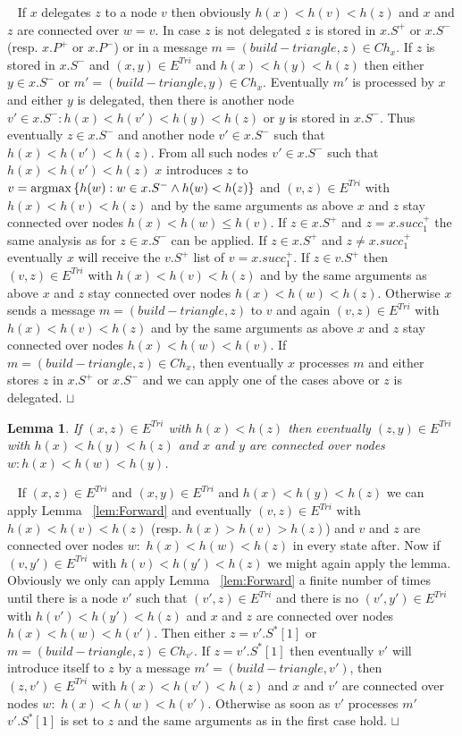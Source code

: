 \documentclass[11pt]{article}
\newtheorem{lemma}[theorem]{Lemma}
\newcommand{\sq}{\hbox{\rlap{$\sqcap$}$\sqcup$}}
\newcommand{\qed}{\hspace*{\fill}\sq}
\newenvironment{proof}{\noindent {\bf Proof.}\ }{\qed\par\vskip 4mm\par}
\def\argmax{{\rm argmax}}
\begin{document}
\begin{proof}
If $x$ delegates $z$ to a node $v$ then obviously $h(x)<h(v)<h(z)$ and $x$ and $z$ are connected over $w=v$.
In case $z$ is not delegated $z$ is stored in $x.S^+$ or $x.S^-$ (resp. $x.P^+$ or $x.P^-$) or in a message $m=(build-triangle,z) \in Ch_x$. If $z$ is stored in $x.S^-$ and  $(x,y) \in E^{Tri}$ and $h(x)<h(y)<h(z)$ then either $y \in x.S^-$ or $m'=(build-triangle,y) \in Ch_x$. Eventually $m'$ is processed by $x$ and either $y$ is delegated, then there is another node $v'\in x.S^- : h(x)<h(v')<h(y)<h(z)$ or $y$ is stored in $x.S^-$. Thus eventually $z \in x.S^-$ and another node $v'\in x.S^-$ such that $h(x)<h(v')<h(z)$. From all such nodes $v'\in x.S^-$ such that $h(x)<h(v')<h(z)$ $x$ introduces $z$ to $v=\argmax \left\{h(w): w \in x.S^- \wedge h(w)<h(z) \right\}$ and $(v,z)\in E^{Tri}$ with $h(x)<h(v)<h(z)$ and by the same arguments as above $x$ and $z$ stay connected over nodes $h(x)<h(w)\leq h(v)$.
If $z \in x.S^+$ and $z= x.succ^+_1$ the same analysis as for $z\in x.S^-$ can be applied. If $z \in x.S^+$ and $z\neq x.succ^+_1$ eventually $x$ will receive the $v.S^+$ list of $v=x.succ^+_1$. If $z \in v.S^+$ then $(v,z)\in E^{Tri}$ with $h(x)<h(v)<h(z)$ and by the same arguments as above $x$ and $z$ stay connected over nodes $h(x)<h(w)<h(z)$. Otherwise $x$ sends a message $m=(build-triangle,z)$ to $v$ and again $(v,z)\in E^{Tri}$ with $h(x)<h(v)<h(z)$ and by the same arguments as above $x$ and $z$ stay connected over nodes $h(x)<h(w)<h(v)$.
If $m=(build-triangle,z) \in Ch_x$, then eventually $x$ processes $m$ and either stores $z$ in $x.S^+$ or $x.S^-$ and we can apply one of the cases above or $z$ is delegated.
\end{proof}

\begin{lemma}\label{lem:Mirror}
If $(x,z) \in E^{Tri}$ with $h(x)<h(z)$ then eventually $(z,y)\in E^{Tri}$ with $h(x)<h(y)<h(z)$ and $x$ and $y$ are connected over nodes $w: h(x)<h(w)<h(y)$.
\end{lemma}

\begin{proof}
If $(x,z) \in E^{Tri}$ and $(x,y) \in E^{Tri}$ and $h(x)<h(y)<h(z)$ we can apply Lemma ~\ref{lem:Forward} and eventually $(v,z)\in E^{Tri}$ with $h(x)<h(v)<h(z)$ (resp. $h(x)>h(v)>h(z)$) and $v$ and $z$ are connected over nodes $w:$ $h(x)<h(w)<h(z)$ in every state after. Now if $(v,y')\in E^{Tri}$ with $h(v)<h(y')<h(z)$ we might again apply the lemma. Obviously we only can apply Lemma ~\ref{lem:Forward} a finite number of times until there is a node $v'$ such that $(v',z)\in E^{Tri}$ and there is no $(v',y')\in E^{Tri}$ with $h(v')<h(y')<h(z)$ and $x$ and $z$ are connected over nodes $h(x)<h(w)<h(v')$. Then either $z=v'.S^*[1]$ or $m=(build-triangle,z) \in Ch_{v'}$. If $z=v'.S^*[1]$ then eventually $v'$ will introduce itself to $z$ by a message $m'=(build-triangle,v')$, then $(z,v')\in E^{Tri}$ with $h(x)<h(v')<h(z)$ and $x$ and $v'$ are connected over nodes $w:$ $h(x)<h(w)<h(v')$.
Otherwise as soon as $v'$ processes $m'$ $v'.S^*[1]$ is set to $z$ and the same arguments as in the first case hold.
\end{proof}
\end{document}
